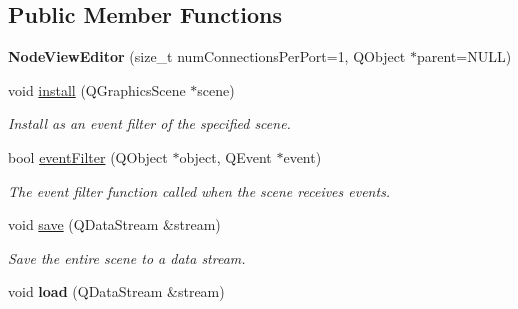 \subsection*{Public Member Functions}
\begin{DoxyCompactItemize}
\item 
\mbox{\label{classrev_1_1_view_1_1_node_view_editor_ae901fbfc912257ae1ff411e23573656e}} 
{\bfseries Node\+View\+Editor} (size\+\_\+t num\+Connections\+Per\+Port=1, Q\+Object $\ast$parent=N\+U\+LL)
\item 
\mbox{\label{classrev_1_1_view_1_1_node_view_editor_a8157d39a2ab51ef8dd2ac71f12b4eef0}} 
void \mbox{\hyperlink{classrev_1_1_view_1_1_node_view_editor_a8157d39a2ab51ef8dd2ac71f12b4eef0}{install}} (Q\+Graphics\+Scene $\ast$scene)
\begin{DoxyCompactList}\small\item\em Install as an event filter of the specified scene. \end{DoxyCompactList}\item 
bool \mbox{\hyperlink{classrev_1_1_view_1_1_node_view_editor_a909735398dd3e02ed57ed8b51ef6f760}{event\+Filter}} (Q\+Object $\ast$object, Q\+Event $\ast$event)
\begin{DoxyCompactList}\small\item\em The event filter function called when the scene receives events. \end{DoxyCompactList}\item 
\mbox{\label{classrev_1_1_view_1_1_node_view_editor_ae8bb751c9a36f6848d01b8f3e27a7cf0}} 
void \mbox{\hyperlink{classrev_1_1_view_1_1_node_view_editor_ae8bb751c9a36f6848d01b8f3e27a7cf0}{save}} (Q\+Data\+Stream \&stream)
\begin{DoxyCompactList}\small\item\em Save the entire scene to a data stream. \end{DoxyCompactList}\item 
\mbox{\label{classrev_1_1_view_1_1_node_view_editor_a0953a204f815acdd1eed322d83bdbee5}} 
void {\bfseries load} (Q\+Data\+Stream \&stream)
\item 
\mbox{\label{classrev_1_1_view_1_1_node_view_editor_a4d8fd4e5053de3c296f703464e7977a8}} 

\end{DoxyCompactItemize}
